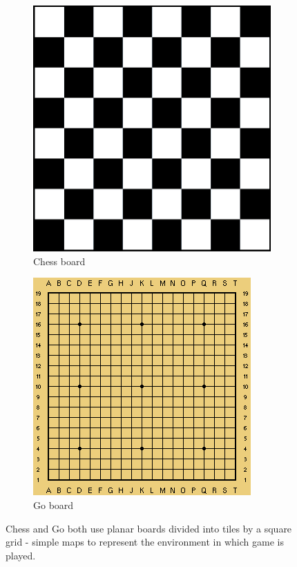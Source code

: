 \documentclass[12pt]{report}
\begin{document}
\begin{figure}[h]
	\centering
	\begin{subfigure}[b]{0.4\linewidth}
		\centering
		\includegraphics[width=\textwidth]{images/chessboard}
		\caption{Chess board} 
	\end{subfigure}
	\hfill
	\begin{subfigure}[b]{0.4\linewidth}
		\centering
		\includegraphics[width=\textwidth]{images/goboard}
		\caption{Go board} 
	\end{subfigure} 
	\caption{Chess and Go both use planar boards divided into tiles by a square grid - simple maps to represent the environment in which game is played.}
	\label{fig:neighborhood_types}
\end{figure}
 
\end{document}
